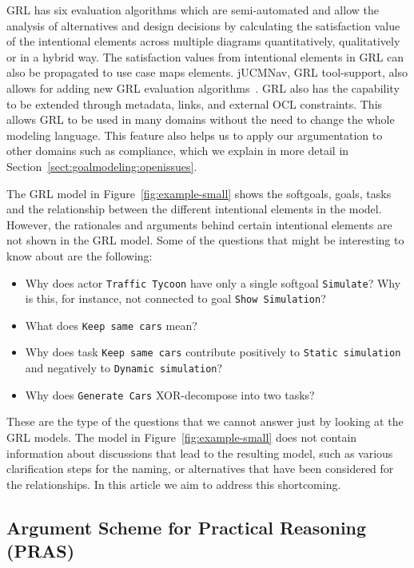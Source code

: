 GRL has six evaluation algorithms which are semi-automated and allow the analysis of alternatives and design decisions by calculating the satisfaction value of the intentional elements across multiple diagrams quantitatively, qualitatively or in a hybrid way. The satisfaction values from intentional elements in GRL can also be propagated to use case maps elements.  jUCMNav, GRL tool-support, also allows for adding new GRL evaluation algorithms~\cite{jUCMNav}. GRL also has the capability to be extended through metadata, links, and external OCL constraints. This allows GRL to be used in many domains without the need to change the whole modeling language. This feature also helps us to apply our argumentation to other domains such as compliance, which we explain in more detail in Section~\ref{sect:goalmodeling:openissues}.

The GRL model in Figure~\ref{fig:example-small} shows the softgoals, goals, tasks and the relationship between the different intentional elements in the model. However, the rationales and arguments behind certain intentional elements are not shown in the GRL model. Some of the questions that might be interesting to know about are the following:

\begin{itemize}
	\item Why does actor \texttt{Traffic Tycoon} have only a single softgoal \texttt{Simulate}? Why is this, for instance, not connected to goal \texttt{Show Simulation}?
	\item What does \texttt{Keep same cars} mean?
	\item Why does task \texttt{Keep same cars} contribute positively to \texttt{Static simulation} and negatively to \texttt{Dynamic simulation}?
	\item Why does \texttt{Generate Cars} XOR-decompose into two tasks?
\end{itemize}

These are the type of the questions that we cannot answer just by looking at the GRL models. The model in Figure~\ref{fig:example-small} does not contain information about discussions that lead to the resulting model, such as various clarification steps for the naming, or alternatives that have been considered for the relationships. In this article we aim to address this shortcoming.

\subsection{Argument Scheme for Practical Reasoning (PRAS)}
\label{sect:background:pras}

